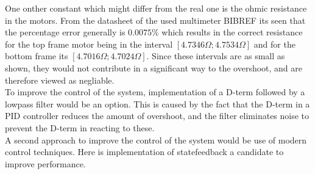 \documentclass[../../main]{subfiles}
\begin{document}
One onther constant which might differ from the real one is the ohmic resistance in the motors. From the datasheet of the used multimeter BIBREF its seen that the percentage error generally is $0.0075\%$ which results in the correct resistance for the top frame motor being in the interval $[4.7346\Omega;4.7534\Omega]$ and for the bottom frame its $[4.7016\Omega;4.7024\Omega]$. Since these intervals are as small as shown, they would not contribute in a significant way to the overshoot, and are therefore viewed as negliable.\\

To improve the control of the system, implementation of a D-term followed by a lowpass filter would be an option. This is caused by the fact that the D-term in a PID controller reduces the amount of overshoot, and the filter eliminates noise to prevent the D-term in reacting to these.\\
A second approach to improve the control of the system would be use of modern control techniques. Here is implementation of statefeedback a candidate to improve performance.
\end{document}
